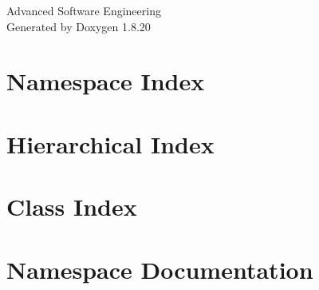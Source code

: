 \let\mypdfximage\pdfximage\def\pdfximage{\immediate\mypdfximage}\documentclass[twoside]{book}
\newcommand{\+}{\discretionary{\mbox{\scriptsize$\hookleftarrow$}}{}{}}
\newcommand{\clearemptydoublepage}{%
  \newpage{\pagestyle{empty}\cleardoublepage}%
}
\begin{document}
\hypersetup{pageanchor=false,
             bookmarksnumbered=true,
             pdfencoding=unicode
            }
\begin{titlepage}
\vspace*{7cm}
\begin{center}%
{\Large Advanced Software Engineering }\\
\vspace*{1cm}
{\large Generated by Doxygen 1.8.20}\\
\end{center}
\end{titlepage}
\clearemptydoublepage
{}
\tableofcontents
\clearemptydoublepage
{}
\hypersetup{pageanchor=true}

\chapter{Namespace Index}

\chapter{Hierarchical Index}

\chapter{Class Index}

\chapter{Namespace Documentation}











\end{document}

